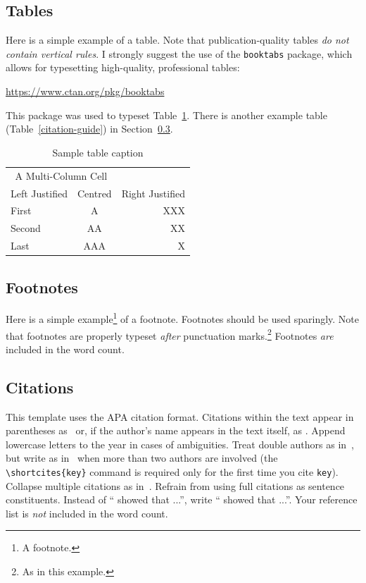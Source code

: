 \documentclass[12pt,a4paper]{article}
\begin{document}
\subsection{Tables}

Here is a simple example of a table. Note that publication-quality tables
\textit{do not contain vertical rules}. I strongly suggest the use of the
\texttt{booktabs} package, which allows for typesetting high-quality,
professional tables:

\url{https://www.ctan.org/pkg/booktabs}

\noindent
This package was used to typeset Table~\ref{table:sample-table}. There is another
example table (Table~\ref{citation-guide}) in Section~\ref{sec:citations}.

\begin{table}[h]
    \centering
    \begin{tabular}{lcr}
        \toprule
        \multicolumn{2}{c}{A Multi-Column Cell} &  \\
        \cmidrule(r){1-2}
        Left Justified & Centred & Right Justified \\
        \midrule
        First          & A       & XXX             \\
        Second         & AA      & XX              \\
        Last           & AAA     & X               \\
        \bottomrule
    \end{tabular}
    \caption{Sample table caption}
    \label{table:sample-table}
\end{table}

\subsection{Footnotes}

Here is a simple example\footnote{A footnote.} of a footnote. Footnotes should
be used sparingly. Note that footnotes are properly typeset \textit{after}
punctuation marks.\footnote{As in this example.} Footnotes \textit{are} included
in the word count.

\subsection{Citations} \label{sec:citations}

This template uses the APA citation format. Citations within the text appear in 
parentheses as~\citep{Chang14} or, if the author's name appears in the text
itself, as \citet{Chang14}. Append lowercase letters to the year in cases of
ambiguities. Treat double authors as in~\citep{Mankiw14}, but write as
in~\citep{Floud14} when more than two authors are
involved (the \verb|\shortcites{key}| command is required only for the first
time you cite \texttt{key}). Collapse multiple citations as
in~\citep{Mankiw14,Floud14}. Refrain from using full citations as sentence
constituents. Instead of ``\citep{Chang14} showed that ...'', write
``\citet{Chang14} showed that ...''. Your reference list is \textit{not}
included in the word count.
\end{document}
